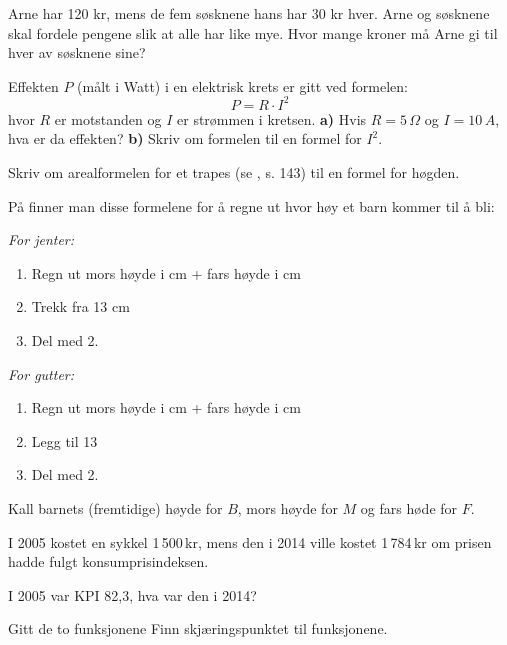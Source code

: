 \newpage


Arne har 120 kr, mens de fem søsknene hans har 30 kr hver. Arne og søsknene skal fordele pengene slik at alle har like mye. Hvor mange kroner må Arne gi til hver av søsknene sine?

Effekten $ P $ (målt i Watt) i en elektrisk krets er gitt ved formelen:
\[ P=R\cdot I^2 \]
hvor $ R $ er motstanden og $ I $ er strømmen i kretsen.\os
\textbf{a)} Hvis $ {R=5\,\Omega} $ og $ {I=10\,A} $, hva er da effekten?\os
\textbf{b)} Skriv om formelen til en formel for $ I^2 $.

Skriv om arealformelen for et trapes (se \mb, s. 143) til en formel for høgden.

På
 finner man disse formelene for å regne ut hvor høy et barn kommer til å bli:\os

\textit{For jenter:}
\begin{enumerate}
	\item Regn ut mors høyde i cm + fars høyde i cm
	\item Trekk fra 13 cm
	\item Del med 2.
\end{enumerate}

\textit{For gutter:}
\begin{enumerate}
	\item Regn ut mors høyde i cm + fars høyde i cm
	\item Legg til 13 
	\item Del med 2.
\end{enumerate}
Kall barnets (fremtidige) høyde for $ B $, mors høyde for $ M $ og fars høde for $ F $.

I 2005 kostet en sykkel 1\,500\,kr, mens den i 2014 ville kostet 1\,784\,kr om prisen hadde fulgt konsumprisindeksen. \os

I 2005 var KPI 82,3, hva var den i 2014?

\nes
{}
Gitt de to funksjonene
Finn skjæringspunktet til funksjonene.


